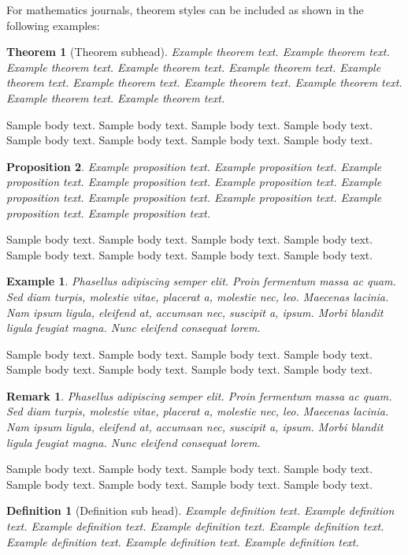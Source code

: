 \documentclass[sn-standardnature]{sn-jnl}%
\theoremstyle{thmstyleone}%
\newtheorem{theorem}{Theorem}%
\newtheorem{proposition}[theorem]{Proposition}%
\theoremstyle{thmstyletwo}%
\newtheorem{example}{Example}%
\newtheorem{remark}{Remark}%
\theoremstyle{thmstylethree}%
\newtheorem{definition}{Definition}%
\begin{document}
For mathematics journals, theorem styles can be included as shown in the following examples:

\begin{theorem}[Theorem subhead]\label{thm1}
Example theorem text. Example theorem text. Example theorem text. Example theorem text. Example theorem text. 
Example theorem text. Example theorem text. Example theorem text. Example theorem text. Example theorem text. 
Example theorem text. 
\end{theorem}

Sample body text. Sample body text. Sample body text. Sample body text. Sample body text. Sample body text. Sample body text. Sample body text.

\begin{proposition}
Example proposition text. Example proposition text. Example proposition text. Example proposition text. Example proposition text. 
Example proposition text. Example proposition text. Example proposition text. Example proposition text. Example proposition text. 
\end{proposition}

Sample body text. Sample body text. Sample body text. Sample body text. Sample body text. Sample body text. Sample body text. Sample body text.

\begin{example}
Phasellus adipiscing semper elit. Proin fermentum massa
ac quam. Sed diam turpis, molestie vitae, placerat a, molestie nec, leo. Maecenas lacinia. Nam ipsum ligula, eleifend
at, accumsan nec, suscipit a, ipsum. Morbi blandit ligula feugiat magna. Nunc eleifend consequat lorem. 
\end{example}

Sample body text. Sample body text. Sample body text. Sample body text. Sample body text. Sample body text. Sample body text. Sample body text.

\begin{remark}
Phasellus adipiscing semper elit. Proin fermentum massa
ac quam. Sed diam turpis, molestie vitae, placerat a, molestie nec, leo. Maecenas lacinia. Nam ipsum ligula, eleifend
at, accumsan nec, suscipit a, ipsum. Morbi blandit ligula feugiat magna. Nunc eleifend consequat lorem. 
\end{remark}

Sample body text. Sample body text. Sample body text. Sample body text. Sample body text. Sample body text. Sample body text. Sample body text.

\begin{definition}[Definition sub head]
Example definition text. Example definition text. Example definition text. Example definition text. Example definition text. Example definition text. Example definition text. Example definition text. 
\end{definition}
\end{document}
